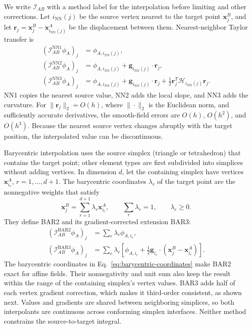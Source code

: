 \documentclass[a4paper,fleqn]{cas-sc}
\newcommand{\calI}{\mathcal{I}}
\begin{document}
We write $\calI_{AB}$ with a method label for the interpolation before limiting and other corrections. Let $i_{\mathrm{NN}}(j)$ be the source vertex nearest to the target point $\boldsymbol x_j^B$, and let $\boldsymbol r_j=\boldsymbol x_j^B-\boldsymbol x_{i_{\mathrm{NN}}(j)}^A$ be the displacement between them. Nearest-neighbor Taylor transfer is
\begin{align}
 (\calI^{\mathrm{NN1}}_{AB}\phi_A)_j
 &=\phi_{A,i_{\mathrm{NN}}(j)},\label{eq:nn1}\\
 (\calI^{\mathrm{NN2}}_{AB}\phi_A)_j
 &=\phi_{A,i_{\mathrm{NN}}(j)}
       +\boldsymbol g_{i_{\mathrm{NN}}(j)}\cdot\boldsymbol r_j,\label{eq:nn2}\\
 (\calI^{\mathrm{NN3}}_{AB}\phi_A)_j
 &=\phi_{A,i_{\mathrm{NN}}(j)}
       +\boldsymbol g_{i_{\mathrm{NN}}(j)}\cdot\boldsymbol r_j
       +\tfrac12\boldsymbol r_j^T\mathcal H_{i_{\mathrm{NN}}(j)}\boldsymbol r_j.
 \label{eq:nn3}
\end{align}
NN1 copies the nearest source value, NN2 adds the local slope, and NN3 adds the curvature. For $\|\boldsymbol r_j\|_2=O(h)$, where $\|\cdot\|_2$ is the Euclidean norm, and sufficiently accurate derivatives, the smooth-field errors are $O(h)$, $O(h^2)$, and $O(h^3)$. Because the nearest source vertex changes abruptly with the target position, the interpolated value can be discontinuous.

Barycentric interpolation uses the source simplex (triangle or tetrahedron) that contains the target point; other element types are first subdivided into simplices without adding vertices. In dimension $d$, let the containing simplex have vertices $\boldsymbol x_{i_r}^A$, $r=1,\ldots,d+1$. The barycentric coordinates $\lambda_r$ of the target point are the nonnegative weights that satisfy
\begin{equation}
 \boldsymbol x_j^B=\sum_{r=1}^{d+1}\lambda_r \boldsymbol x_{i_r}^A,
 \qquad \sum_r\lambda_r=1,
 \qquad \lambda_r\geq0.
 \label{eq:barycentric-coordinates}
\end{equation}
They define BAR2 and its gradient-corrected extension BAR3:
\begin{align}
 (\calI^{\mathrm{BAR2}}_{AB}\phi_A)_j
 &=\sum_r\lambda_r\phi_{A,i_r},\label{eq:bar2}\\
 (\calI^{\mathrm{BAR3}}_{AB}\phi_A)_j
 &=\sum_r\lambda_r\left[\phi_{A,i_r}
       +\tfrac12\boldsymbol g_{i_r}\cdot(\boldsymbol x_j^B-\boldsymbol x_{i_r}^A)\right].\label{eq:bar3}
\end{align}
The barycentric coordinates in Eq.~\eqref{eq:barycentric-coordinates} make BAR2 exact for affine fields. Their nonnegativity and unit sum also keep the result within the range of the containing simplex's vertex values. BAR3 adds half of each vertex gradient correction, which makes it third-order consistent, as shown next. Values and gradients are shared between neighboring simplices, so both interpolants are continuous across conforming simplex interfaces. Neither method constrains the source-to-target integral.
\end{document}
